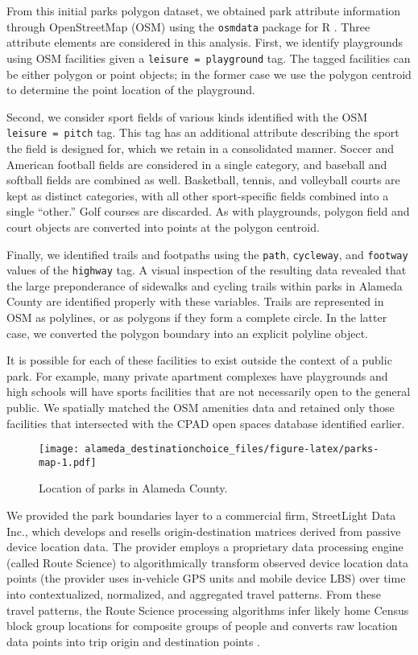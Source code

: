 \documentclass[3p, authoryear, review]{elsarticle} %
\begin{document}
From this initial parks polygon dataset, we obtained park attribute information
through OpenStreetMap (OSM) using the \texttt{osmdata} package for R \citep{osmdata}. Three
attribute elements are considered in this analysis. First, we identify
playgrounds using OSM facilities given a \texttt{leisure\ =\ playground} tag. The tagged
facilities can be either polygon or point objects; in the former case we use the
polygon centroid to determine the point location of the playground.

Second, we consider sport fields of various kinds identified with the OSM
\texttt{leisure\ =\ pitch} tag. This tag has an additional attribute describing the sport
the field is designed for, which we retain in a consolidated manner. Soccer and
American football fields are considered in a single category, and baseball and
softball fields are combined as well. Basketball, tennis, and volleyball courts
are kept as distinct categories, with all other sport-specific fields combined
into a single ``other.'' Golf courses are discarded. As with playgrounds, polygon
field and court objects are converted into points at the polygon centroid.

Finally, we identified trails and footpaths using the \texttt{path}, \texttt{cycleway}, and
\texttt{footway} values of the \texttt{highway} tag. A visual inspection of the resulting data
revealed that the large preponderance of sidewalks and cycling trails within
parks in Alameda County are identified properly with these variables. Trails are
represented in OSM as polylines, or as polygons if they form a complete circle.
In the latter case, we converted the polygon boundary into an explicit polyline
object.

It is possible for each of these facilities to exist outside the context of a
public park. For example, many private apartment complexes have playgrounds and
high schools will have sports facilities that are not necessarily open to the
general public. We spatially matched the OSM amenities data and retained only
those facilities that intersected with the CPAD open spaces database identified
earlier.

\begin{figure}
\centering
\texttt{[image: alameda\_destinationchoice\_files/figure-latex/parks-map-1.pdf]}
\caption{\label{fig:parks-map}Location of parks in Alameda County.}
\end{figure}

We provided the park boundaries layer to a commercial firm, StreetLight Data
Inc., which develops and resells origin-destination matrices derived from
passive device location data. The provider employs a proprietary data processing
engine (called Route Science) to algorithmically transform observed device
location data points (the provider uses in-vehicle GPS units and mobile device
LBS) over time into contextualized, normalized, and aggregated travel patterns.
From these travel patterns, the Route Science processing algorithms infer likely
home Census block group locations for composite groups of people and converts
raw location data points into trip origin and destination points \citep{Pan2006, Friedrich2010}.
\end{document}
